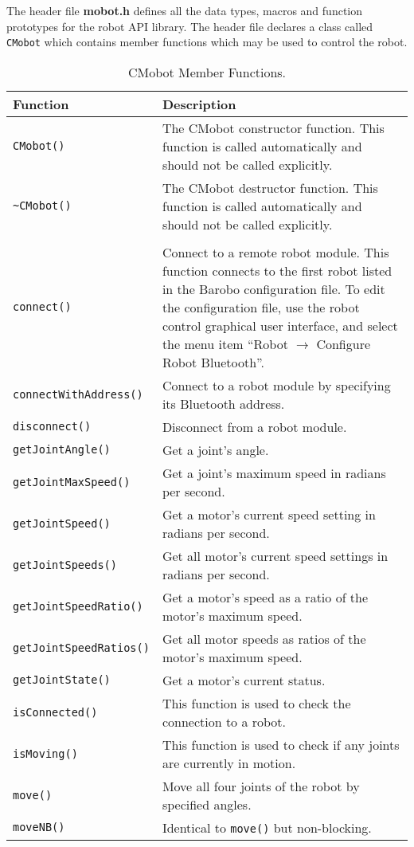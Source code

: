 \noindent
The header file {\bf mobot.h} defines all the data types, macros 
and function prototypes for the robot API library. The header file
declares a class called \texttt{CMobot} which contains member functions which
may be used to control the robot.

\begin{table}[!h]
\begin{center}
\caption{CMobot Member Functions.}
\begin{tabular}{p{38 mm}p{110 mm}}
\hline
Function & Description \\
\hline
\texttt{CMobot()} & The CMobot constructor function. This function
is called automatically and should not be called explicitly. \\
\texttt{\textasciitilde CMobot()} & The CMobot destructor function. This function
is called automatically and should not be called explicitly. \\
& \\
\texttt{connect()} & Connect to a remote robot module. This function 
connects to the first robot listed in the Barobo configuration file. To
edit the configuration file, use the robot control graphical user interface,
and select the menu item ``Robot $\rightarrow$ Configure Robot Bluetooth''. \\
\texttt{connectWithAddress()} & Connect to a robot module by specifying its Bluetooth address. \\
\texttt{disconnect()} & Disconnect from a robot module. \\
\texttt{getJointAngle()} & Get a joint's angle. \\
\texttt{getJointMaxSpeed()} & Get a joint's maximum speed in radians per second. \\
\texttt{getJointSpeed()} & Get a motor's current speed setting in radians per second. \\
\texttt{getJointSpeeds()} & Get all motor's current speed settings in radians per second. \\
\texttt{getJointSpeedRatio()} & Get a motor's speed as a ratio of the motor's maximum speed. \\
\texttt{getJointSpeedRatios()} & Get all motor speeds as ratios of the motor's maximum speed. \\
\texttt{getJointState()} & Get a motor's current status. \\
\texttt{isConnected()} & This function is used to check the connection to a robot. \\
\texttt{isMoving()} & This function is used to check if any joints are currently in motion. \\
\texttt{move()} & Move all four joints of the robot by specified angles. \\
\texttt{moveNB()} & Identical to \texttt{move()} but non-blocking. \\


\end{tabular}
\end{center}
\end{table}
